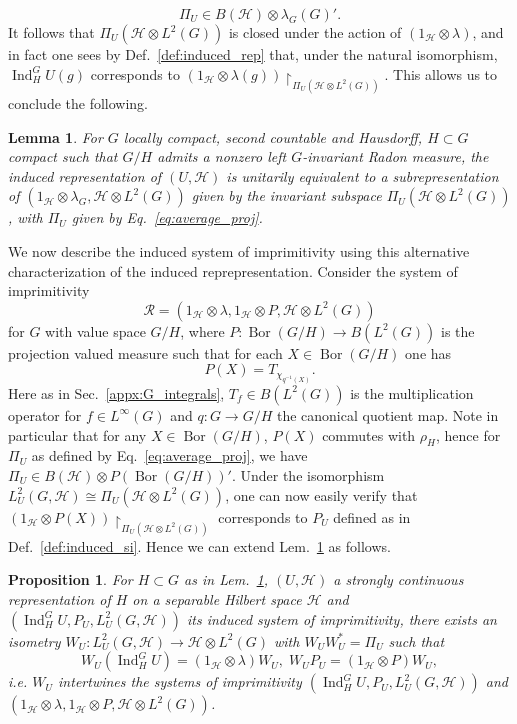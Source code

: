 \documentclass[sn-mathphys-num]{sn-jnl}%
\newcommand{\HH}{\mathcal{H}}
\DeclareMathOperator{\Bor}{Bor}
\DeclareMathOperator{\Ind}{Ind}
\numberwithin{equation}{section}
\theoremstyle{thmstyleone}%
\newtheorem{proposition}[theorem]{Proposition}%
\newtheorem{lemma}[theorem]{Lemma}
\theoremstyle{thmstyletwo}%
\theoremstyle{thmstylethree}%
\begin{document}
    \begin{equation}
        \Pi_U\in B(\HH)\otimes\lambda_G(G)'.
    \end{equation}
    It follows that $\Pi_{U}(\HH\otimes L^2(G))$ is closed under the action of $(1_\HH\otimes \lambda)$, and in fact one sees by Def.\ \ref{def:induced_rep} that, under the natural isomorphism, $\Ind_H^G U(g)$ corresponds to $(1_\HH\otimes\lambda(g))\restriction_{\Pi_{U}(\HH\otimes L^2(G))}$. This allows us to conclude the following.
    \begin{lemma}
        \label{lem:compact_subrep}
        For $G$ locally compact, second countable and Hausdorff, $H\subset G$ compact such that $G/H$ admits a nonzero left $G$-invariant Radon measure, the induced representation of $(U,\HH)$ is unitarily equivalent to a subrepresentation of $(1_\HH\otimes\lambda_G,\HH\otimes L^2(G))$ given by the invariant subspace $\Pi_U(\HH\otimes L^2(G))$, with $\Pi_U$ given by Eq.\ \eqref{eq:average_proj}.
    \end{lemma}
    
    
    We now describe the induced system of imprimitivity using this alternative characterization of the induced reprepresentation. Consider the system of imprimitivity
    \begin{equation}
        \label{eq:compact_stab_qrf_dilated}
        \mathcal{R}=(1_\HH\otimes \lambda, 1_\HH\otimes P,\HH\otimes L^2(G))
    \end{equation} for $G$ with value space $G/H$, where $P:\Bor(G/H)\to B(L^2(G))$ is the projection valued measure such that for each $X\in\Bor(G/H)$ one has \begin{equation}
        \label{eq:compact_stab_dilated_proj}
        P(X)=T_{\chi_{q^{-1}(X)}}.
    \end{equation} Here as in Sec.\ \ref{appx:G_integrals},  $T_f\in B(L^2(G))$ is the multiplication operator for $f\in L^\infty(G)$ and $q:G\to G/H$ the canonical quotient map. Note in particular that for any $X\in \Bor(G/H)$, $P(X)$ commutes with $\rho_H$, hence for $\Pi_U$ as defined by Eq.\ \eqref{eq:average_proj}, we have $\Pi_U\in B(\HH)\otimes P(\Bor(G/H))'$. Under the isomorphism $L^2_U(G,\HH)\cong \Pi_U(\HH\otimes L^2(G))$, one can now easily verify that $(1_\HH\otimes P(X))\restriction_{\Pi_U(\HH\otimes L^2(G))}$ corresponds to $P_U$ defined as in Def.\ \ref{def:induced_si}. Hence we can extend Lem.\ \ref{lem:compact_subrep} as follows.
    \begin{proposition}
        \label{prop:compact_ind_impr}
        For $H\subset G$ as in Lem.\ \ref{lem:compact_subrep}, 
        $(U,\HH)$ a strongly continuous representation of $H$ on a separable Hilbert space $\HH$ 
        and $(\Ind_H^GU,P_U,L^2_U(G,\HH))$ its induced system of imprimitivity, there exists an isometry $W_U:L^2_U(G,\HH)\to\HH\otimes L^2(G)$ with $W_UW_U^*=\Pi_U$ such that
        \begin{equation}
            W_U(\Ind_H^G U)=(1_\HH\otimes\lambda)W_U,\; W_UP_U=(1_\HH\otimes P)W_U,
        \end{equation}
        i.e. $W_U$ intertwines the systems of imprimitivity $(\Ind_H^GU,P_U,L^2_U(G,\HH))$ and $(1_\HH\otimes \lambda, 1_\HH\otimes P,\HH\otimes L^2(G))$.
    \end{proposition}
    
\end{document}
